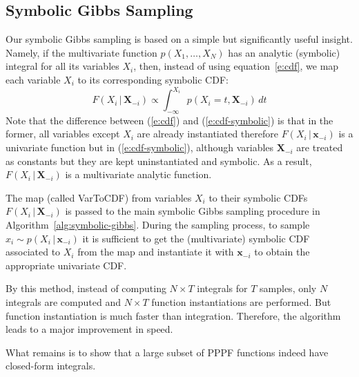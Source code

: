 \documentclass[letterpaper]{article}
\newcommand{\bvec}[1]{\textbf{#1}}
\newcommand{\pr}{p}
\begin{document}
\subsection{Symbolic Gibbs Sampling}
Our symbolic Gibbs sampling is based on a simple but significantly useful insight.
Namely, if the multivariate function $\pr(X_1, \ldots, X_N)$
has an analytic (symbolic) integral for all its variables $X_i$,
then, instead of using equation~\ref{e:cdf}, we map each variable $X_i$ to its corresponding symbolic CDF: 
{\footnotesize
\begin{equation}
\label{e:cdf-symbolic}
F(X_i  \,|\, \bvec{X}_{-i}) 
\propto
\int_{-\infty}^{X_i} \!\!\!\!\! \pr(X_i = t , \bvec{X}_{-i}) \, d  t
\end{equation} 
}
Note that the difference between (\ref{e:cdf}) and (\ref{e:cdf-symbolic}) is that in the former, 
all variables except $X_i$ are already instantiated therefore 
$F(X_i  \,|\, \bvec{x}_{-i})$ is a univariate function but in  (\ref{e:cdf-symbolic}), 
although variables $\bvec{X}_{-i}$ are treated as constants but they are kept uninstantiated and symbolic.
As a result, $F(X_i \,|\, \bvec{X}_{-i})$ is a multivariate analytic function. 

The map (called {\sc VarToCDF}) from variables $X_i$ to their symbolic CDFs
$F(X_i \,|\, \bvec{X}_{-i})$ is passed to the main symbolic Gibbs sampling procedure in Algorithm~\ref{alg:symbolic-gibbs}.
During the sampling process, 
to sample $x_i \sim \pr(X_i \,|\, \bvec{x}_{-i})$
it is sufficient to get the (multivariate) symbolic CDF associated to $X_i$ from the map
and instantiate it with $\bvec{x}_{-i}$ to obtain the appropriate univariate CDF.

By this method, instead of computing $N \times T$ integrals for $T$ samples, only $N$ integrals are computed and 
$N \times T$ function instantiations are performed. But function instantiation is much faster than integration.
Therefore, the algorithm leads to a major improvement in speed.

What remains is to show that a large subset of PPPF functions indeed have closed-form integrals. 
\end{document}
